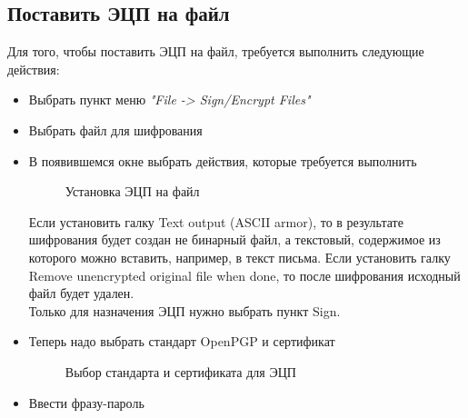 \documentclass[10pt,a4paper]{report}
\begin{document}
\subsection{Поставить ЭЦП на файл}
Для того, чтобы поставить ЭЦП на файл, требуется выполнить следующие действия:
\begin{itemize}
\item Выбрать пункт меню \textit{"File -> Sign/Encrypt Files"}
\item Выбрать файл для шифрования
\item В появившемся окне выбрать действия, которые требуется выполнить
\begin{figure}[h]
\caption {Установка ЭЦП на файл}
\label{ris:image5}
\end{figure}
Если установить галку Text output (ASCII armor), то в результате шифрования будет создан не бинарный файл, а текстовый, содержимое из которого можно вставить, например, в текст письма. Если установить галку Remove unencrypted original file when done, то после шифрования исходный файл будет удален.\\
Только для назначения ЭЦП нужно выбрать пункт Sign.
\item Теперь надо выбрать стандарт OpenPGP и сертификат
\begin{figure}[h]	
\caption{Выбор стандарта и сертификата для ЭЦП}
\label{ris:image6}
\end{figure}
\item Ввести фразу-пароль

\end{itemize}
\end{document}
